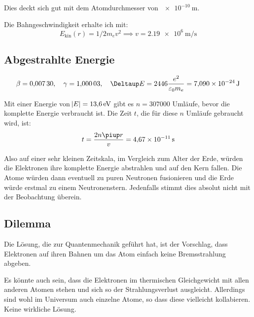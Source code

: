 Dies deckt sich gut mit dem Atomdurchmesser von $\SI{e-10}{\meter}$.

Die Bahngeschwindigkeit erhalte ich mit:
\[
	E_\text{kin}(r) = 1/2 m_e v^2
	\implies
	v = \SI{2.19e6}{\meter\per\second}
\]

\subsection{Abgestrahlte Energie}

\[
	\beta = \num{0.00730}
	\eqnsep
	\gamma = \num{1.00003}
	\eqnsep
	\Deltaup E = \num{2446} \frac{e^2}{\varepsilon_0 m_e} = \SI{7.090e-24}\joule
\]

Mit einer Energie von $\abs E = \SI{13.6}\electronvolt$ gibt es $n =
\num{307000}$ Umläufe, bevor die komplette Energie verbraucht ist. Die Zeit
$t$, die für diese $n$ Umläufe gebraucht wird, ist:
\[
	t = \frac{2 n \piup r}v = \SI{4.67e-11}\second
\]

Also auf einer sehr kleinen Zeitskala, im Vergleich zum Alter der Erde, würden
die Elektronen ihre komplette Energie abstrahlen und auf den Kern fallen. Die
Atome würden dann eventuell zu puren Neutronen fusionieren und die Erde würde
erstmal zu einem Neutronenstern. Jedenfalls stimmt dies absolut nicht mit der
Beobachtung überein.

\subsection{Dilemma}

Die Lösung, die zur Quantenmechanik geführt hat, ist der Vorschlag, dass
Elektronen auf ihren Bahnen um das Atom einfach keine Bremsstrahlung abgeben.

Es könnte auch sein, dass die Elektronen im thermischen Gleichgewicht mit allen
anderen Atomen stehen und sich so der Strahlungsverlust ausgleicht. Allerdings
sind wohl im Universum auch einzelne Atome, so dass diese vielleicht
kollabieren. Keine wirkliche Lösung.


\IfFileExists{\bibliographyfile}{
}{}



